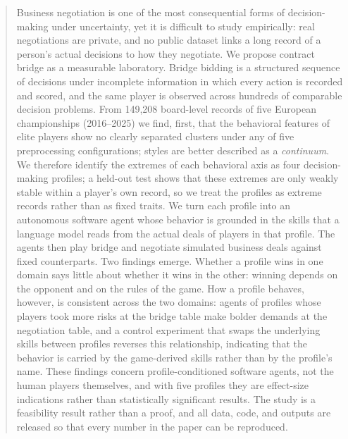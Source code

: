 \documentclass[runningheads]{llncs}
\begin{document}
\begin{abstract}
\noindent
Business negotiation is one of the most consequential forms of
decision-making under uncertainty, yet it is difficult to study
empirically: real negotiations are private, and no public dataset links
a long record of a person's actual decisions to how they negotiate. We
propose contract bridge as a measurable laboratory. Bridge bidding is a
structured sequence of decisions under incomplete information in which
every action is recorded and scored, and the same player is observed
across hundreds of comparable decision problems. From 149{,}208
board-level records of five European championships (2016--2025) we
find, first, that the behavioral features of elite players show no
clearly separated clusters under any of five preprocessing
configurations; styles are better described as a \emph{continuum}. We
therefore identify the extremes of each behavioral axis as four
decision-making profiles; a held-out test shows that these extremes
are only weakly stable within a player's own record, so we treat the
profiles as extreme records rather than as fixed traits. We turn each
profile into an autonomous software agent whose behavior is grounded
in the skills that a language model reads from the actual deals of
players in that profile. The
agents then play bridge and negotiate simulated business deals against
fixed counterparts. Two findings emerge. Whether a profile wins in one
domain says little about whether it wins in the other: winning depends
on the opponent and on the rules of the game. How a profile behaves,
however, is consistent across the two domains: agents of profiles whose
players took more risks at the bridge table make bolder demands at the
negotiation table, and a control experiment that swaps the underlying
skills between profiles reverses this relationship, indicating that the
behavior is carried by the game-derived skills rather than by the
profile's name. These findings concern profile-conditioned software
agents, not the human players themselves, and with five profiles they
are effect-size indications rather than statistically significant
results. The study is a feasibility result rather than a proof, and all
data, code, and outputs are released so that every number in the paper
can be reproduced.

\end{abstract}
\end{document}
